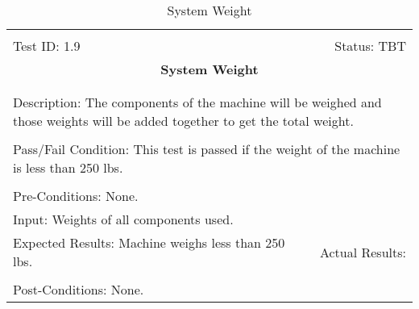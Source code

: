 \documentclass[titlepage]{article}
\begin{document}
\begin{center}%
\begin{table}
\begin{tabular}{|l r|}\hline&\\[-2mm]
	Test ID: 1.9	&Status: TBT\\[-3mm]
	\multicolumn{2}{|c|}{\textbf{\large{System Weight}}}\\&\\\hline&\\[-3mm]
	\multicolumn{2}{|p{\textwidth}|}{Description: The components of the machine will be weighed and those weights will be added together to get the total weight.}\\[1mm]\hline&\\[-3mm]
	\multicolumn{2}{|p{\textwidth}|}{Pass/Fail Condition: This test is passed if the weight of the machine is less than 250 lbs.}\\[1mm]\hline&\\[-3mm]
	\multicolumn{2}{|p{\textwidth}|}{Pre-Conditions: None.}\\[4mm]
	\multicolumn{2}{|p{\textwidth}|}{Input: Weights of all components used.}\\[2mm]\hline
	\multicolumn{1}{|p{0.49\textwidth}}{Expected Results: Machine weighs less than 250 lbs.}	&\multicolumn{1}{|p{0.45\textwidth}|}{Actual Results:}\\\hline&\\[-3mm]
	\multicolumn{2}{|p{\textwidth}|}{Post-Conditions: None.}\\\hline
\end{tabular}
\caption{System Weight}
\end{table}
\end{center}
\end{document}
